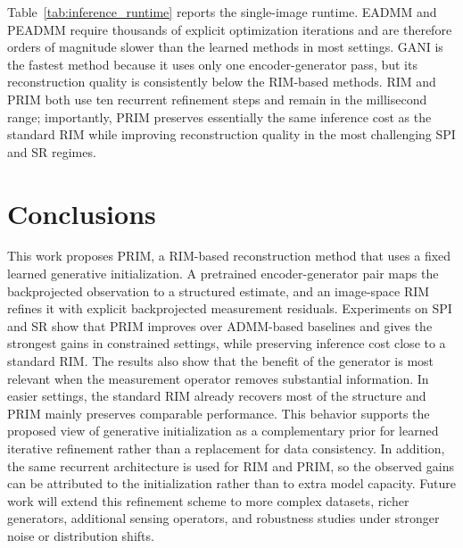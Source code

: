 \documentclass[conference]{IEEEtran}
\begin{document}
Table~\ref{tab:inference_runtime} reports the single-image runtime. EADMM and PEADMM require thousands of explicit optimization iterations and are therefore orders of magnitude slower than the learned methods in most settings. GANI is the fastest method because it uses only one encoder-generator pass, but its reconstruction quality is consistently below the RIM-based methods. RIM and PRIM both use ten recurrent refinement steps and remain in the millisecond range; importantly, PRIM preserves essentially the same inference cost as the standard RIM while improving reconstruction quality in the most challenging SPI and SR regimes.

\section{Conclusions}

This work proposes PRIM, a RIM-based reconstruction method that uses a fixed learned generative initialization. A pretrained encoder-generator pair maps the backprojected observation to a structured estimate, and an image-space RIM refines it with explicit backprojected measurement residuals. Experiments on SPI and SR show that PRIM improves over ADMM-based baselines and gives the strongest gains in constrained settings, while preserving inference cost close to a standard RIM. The results also show that the benefit of the generator is most relevant when the measurement operator removes substantial information. In easier settings, the standard RIM already recovers most of the structure and PRIM mainly preserves comparable performance. This behavior supports the proposed view of generative initialization as a complementary prior for learned iterative refinement rather than a replacement for data consistency. In addition, the same recurrent architecture is used for RIM and PRIM, so the observed gains can be attributed to the initialization rather than to extra model capacity. Future work will extend this refinement scheme to more complex datasets, richer generators, additional sensing operators, and robustness studies under stronger noise or distribution shifts.



\end{document}
